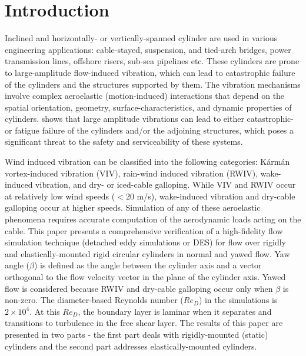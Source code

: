 \section{Introduction}
\label{sec:intro}
%
Inclined and horizontally- or vertically-spanned cylinder are used in various
engineering applications: cable-stayed, suspension, and tied-arch bridges,
power transmission lines, offshore risers, sub-sea pipelines etc. These
cylinders are prone to large-amplitude flow-induced vibration, which can lead
to catastrophic failure of the cylinders and the structures supported by them.
The vibration mechanisms involve complex aeroelastic (motion-induced)
interactions that depend on the spatial orientation, geometry,
surface-characteristics, and dynamic properties of
cylinders. \cite{davenport1995dynamics} shows that large amplitude vibrations
can lead to either catastrophic- or fatigue failure of the cylinders and/or the
adjoining structures, which poses a significant threat to the safety and
serviceability of these systems.

Wind induced vibration can be classified into the following categories:
K\'arm\'an vortex-induced vibration (VIV), rain-wind induced vibration (RWIV),
wake-induced vibration, and dry- or iced-cable galloping. While VIV and RWIV
occur at relatively low wind speeds ($<20$ m/s), wake-induced vibration and
dry-cable galloping occur at higher speeds. Simulation of any of these
aeroelastic phenomena requires accurate computation of the aerodynamic loads
acting on the cable.  This paper presents a comprehensive verification of a
high-fidelity flow simulation technique (detached eddy simulations or DES) for
flow over rigidly and elastically-mounted rigid circular cylinders in normal
and yawed flow. Yaw angle ($\beta$) is defined as the angle between the
cylinder axis and a vector orthogonal to the flow velocity vector in the plane
of the cylinder axis. Yawed flow is considered because RWIV and dry-cable
galloping occur only when $\beta$ is non-zero. The diameter-based Reynolds
number ($Re_D$) in the simulations is $2\times 10^4$. At this $Re_D$, the
boundary layer is laminar when it separates and transitions to turbulence in
the free shear layer. The results of this paper are presented in two parts -
the first part deals with rigidly-mounted (static) cylinders and the second
part addresses elastically-mounted cylinders.

